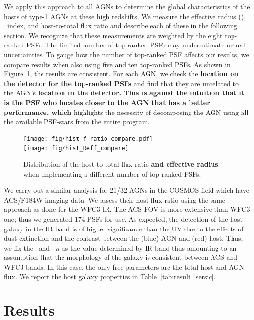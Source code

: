 \documentclass[apj]{emulateapj}
\begin{document}
We apply this approach to all AGNs to determine the global characteristics of the hosts of type-1 AGNs at these high redshifts. We measure the effective radius (\Reff), \sersic\ index, and host-to-total flux ratio and describe each of these in the following section. We recognize that these measurements are weighted by the eight top-ranked PSFs. The limited number of top-ranked PSFs may underestimate actual uncertainties. To gauge how the number of top-ranked PSF affects our results, we compare results when also using five and ten top-ranked PSFs. As shown in Figure~\ref{fig:hist_compare}, the results are consistent. For each AGN, we check the {\bf location on the detector for the top-ranked PSFs} and find that they are unrelated to the AGN's {\bf location in the detector. This is against the intuition that it is the PSF who locates closer to the AGN that has a better performance, which} highlights the necessity of decomposing the AGN using all the available PSF-stars from the entire program.

\begin{figure}
\centering
{
\texttt{[image: fig/hist\_f\_ratio\_compare.pdf]}\\
\texttt{[image: fig/hist\_Reff\_compare]}\\
}
\caption{\label{fig:hist_compare} 
Distribution of the host-to-total flux ratio {\bf and effective radius} when implementing a different number of top-ranked PSFs.}
\end{figure} 


We carry out a similar analysis for 21/32 AGNs in the COSMOS field which have ACS/F184W imaging data. We assess their host flux ratio using the same approach as done for the WFC3-IR. The ACS FOV is more extensive than WFC3 one; thus we generated 174 PSFs for use. As expected, the detection of the host galaxy in the IR band is of higher significance than the UV due to the effects of dust extinction and the contrast between the (blue) AGN and (red) host. Thus, we fix the \Reff\ and \sersic\ $n$ as the value determined by IR band thus amounting to an assumption that the morphology of the galaxy is consistent between ACS and WFC3 bands. In this case, the only free parameters are the total host and AGN flux. We report the host galaxy properties in Table~\ref{tab:result_sersic}.


\section{Results}
\label{sec:result}
\end{document}
